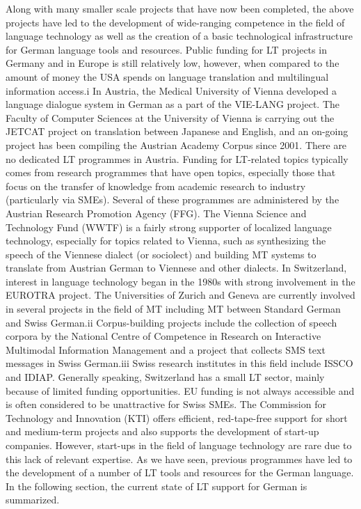 \documentclass[]{../metanetpaper}
\begin{document}
Along with many smaller scale projects that have now been completed, the above projects have led to the development of wide-ranging competence in the field of language technology as well as the creation of a basic technological infrastructure for German language tools and resources. Public funding for LT projects in Germany and in Europe is still relatively low, however, when compared to the amount of money the USA spends on language translation and multilingual information access.i 
In Austria, the Medical University of Vienna developed a language dialogue system in German as a part of the VIE-LANG project. The Faculty of Computer Sciences at the University of Vienna is carrying out the JETCAT project on translation between Japanese and English, and an on-going project has been compiling the Austrian Academy Corpus since 2001. There are no dedicated LT programmes in Austria. Funding for LT-related topics typically comes from research programmes that have open topics, especially those that focus on the transfer of knowledge from academic research to industry (particularly via SMEs). Several of these programmes are administered by the Austrian Research Promotion Agency (FFG). The Vienna Science and Technology Fund (WWTF) is a fairly strong supporter of localized language technology, especially for topics related to Vienna, such as synthesizing the speech of the Viennese dialect (or sociolect) and building MT systems to translate from Austrian German to Viennese and other dialects. 
In Switzerland, interest in language technology began in the 1980s with strong involvement in the EUROTRA project. The Universities of Zurich and Geneva are currently involved in several projects in the field of MT including MT between Standard German and Swiss German.ii Corpus-building projects include the collection of speech corpora by the National Centre of Competence in Research on Interactive Multimodal Information Management and a project that collects SMS text messages in Swiss German.iii Swiss research institutes in this field include ISSCO and IDIAP. Generally speaking, Switzerland has a small LT sector, mainly because of limited funding opportunities. EU funding is not always accessible and is often considered to be unattractive for Swiss SMEs. The Commission for Technology and Innovation (KTI) offers efficient, red-tape-free support for short and medium-term projects and also supports the development of start-up companies. However, start-ups in the field of language technology are rare due to this lack of relevant expertise.
As we have seen, previous programmes have led to the development of a number of LT tools and resources for the German language. In the following section, the current state of LT support for German is summarized.  
\end{document}
